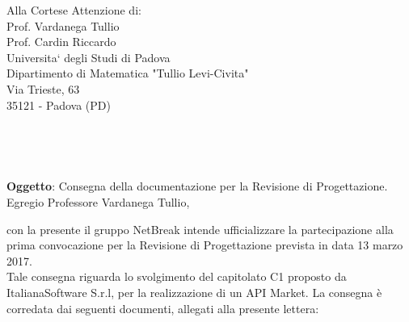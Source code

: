 \documentclass[11pt,a4paper]{letter}
\def\opening#1{\thispagestyle{empty}
{\centering\fromaddress \vspace{0.6in} \\ %
\hspace*{\longindentation}\hspace*{\fill}\par} %
{\raggedright \toname \\ \toaddress \par} %
\vspace{0.1in} %
\noindent #1 %
}
\begin{document}

\begin{letter}
{Alla Cortese Attenzione di:\\
	Prof. Vardanega Tullio\\
	Prof. Cardin Riccardo\\
	Universita` degli Studi di Padova\\
	Dipartimento di Matematica "Tullio Levi-Civita"\\
	Via Trieste, 63\\
	35121 - Padova (PD)\\
}



\opening{\textbf{Oggetto}: Consegna della documentazione per la Revisione di Progettazione.}\\

\noindent Egregio Professore Vardanega Tullio,

\indent con la presente il gruppo NetBreak intende ufficializzare la partecipazione alla prima convocazione per la Revisione di Progettazione prevista in data 13 marzo 2017. \\ Tale consegna riguarda lo svolgimento del capitolato C1 proposto da ItalianaSoftware S.r.l, per la realizzazione di un API Market.
La consegna \`e corredata dai seguenti documenti, allegati alla presente lettera:



\end{letter}
\end{document}
